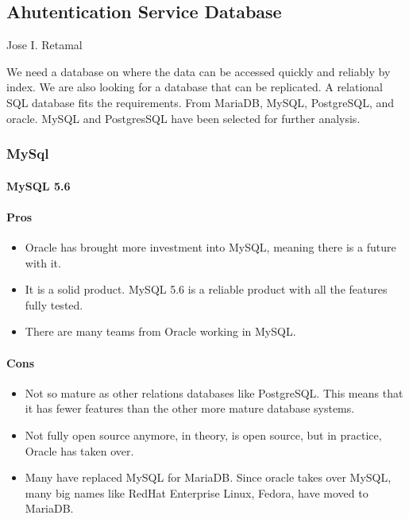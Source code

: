 
\subsection{Ahutentication Service Database}
Jose I. Retamal
\vskip 0.1in
\indent
\indent

We need a database on where the data can be accessed quickly and reliably by index. We are also looking for a database that can be replicated. A relational SQL database fits the requirements. From MariaDB, MySQL, PostgreSQL, and oracle. MySQL and PostgresSQL have been selected for further analysis.

\subsubsection{MySql}

\paragraph{MySQL 5.6 \cite{lbpcmysql}}  
\paragraph{Pros} 
\begin{itemize}
\item Oracle has brought more investment into MySQL, meaning there is a future with it.
 \item It is a solid product. MySQL 5.6 is a reliable product with all the features fully tested.

\item There are many teams from Oracle working in MySQL.
\end{itemize}

\paragraph{Cons}

\begin{itemize}

\item Not so mature as other relations databases like PostgreSQL. This means that it has fewer features than the other more mature database systems.
\item  Not fully open source anymore, in theory, is open source, but in practice, Oracle has taken over. 
\item Many have replaced MySQL for MariaDB. Since oracle takes over MySQL, many big names like RedHat Enterprise Linux, Fedora, have moved to MariaDB.
\end{itemize}
